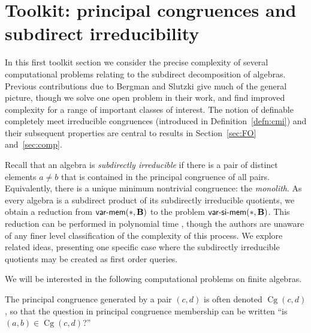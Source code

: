 \documentclass[reqno]{amsart}
\theoremstyle{plain}
\theoremstyle{definition}
\newcommand{\varmem}{\textsf{var-mem}}
\newcommand{\varsimem}{\textsf{var-si-mem}}
\newcommand{\Cg}{\operatorname{Cg}}
\begin{document}
\section{Toolkit: principal congruences and subdirect irreducibility}\label{sec:si}
In this first toolkit section we consider the precise complexity of several computational problems relating to the subdirect decomposition of algebras.  Previous contributions due to Bergman and Slutzki \cite{berslu00,berslu00b,berslu02} give much of the general picture, though we solve one open problem in their work, and find improved complexity for a range of important classes of interest.
The notion of definable completely meet irreducible congruences (introduced in Definition~\ref{defn:cmi}) and their subsequent properties are central to results in Section~\ref{sec:FO} and~\ref{sec:comp}.

Recall that an algebra is \emph{subdirectly irreducible} if there is a pair of distinct elements $a\neq b$ that is contained in the principal congruence of all pairs.  Equivalently, there is a unique minimum nontrivial congruence: the \emph{monolith}.  As every algebra is a subdirect product of its subdirectly irreducible quotients,  we obtain a reduction from $\varmem(*,{\bf B})$ to the problem $\varsimem(*,{\bf B})$.  This reduction can be performed in polynomial time \cite{DDK}, though the authors are unaware of any finer level classification of the complexity of this process.  We explore related ideas, presenting one specific case where the subdirectly irreducible quotients may be created as first order queries.


We will be interested in the following computational problems on finite algebras.


\medskip

The principal congruence generated by a pair $(c,d)$ is often denoted $\Cg(c,d)$, so that the question in \textsf{principal congruence membership} can be written ``is $(a,b)\in \Cg(c,d)$?''
\end{document}
